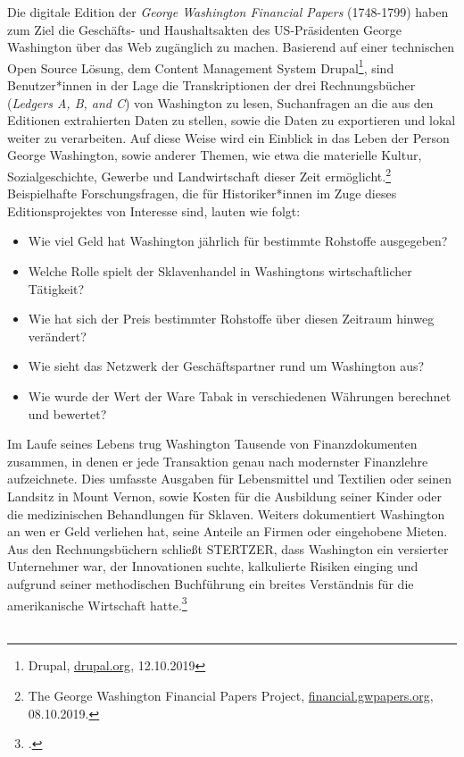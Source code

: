 \documentclass[12pt,a4paper]{article}
\begin{document}
Die digitale Edition der \textit{George Washington Financial Papers} (1748-1799) haben zum Ziel die Geschäfts- und Haushaltsakten des US-Präsidenten George Washington über das Web zugänglich zu machen. Basierend auf einer technischen Open Source Lösung, dem Content Management System Drupal\footnote{Drupal, \protect\url{drupal.org}, 12.10.2019}, sind Benutzer*innen in der Lage die Transkriptionen der drei Rechnungsbücher (\textit{Ledgers A, B, and C}) von Washington zu lesen, Suchanfragen an die aus den Editionen extrahierten Daten zu stellen, sowie die Daten zu exportieren und lokal weiter zu verarbeiten. Auf diese Weise wird ein Einblick in das Leben der Person George Washington, sowie  anderer Themen, wie etwa die materielle Kultur, Sozialgeschichte, Gewerbe und Landwirtschaft dieser Zeit ermöglicht.\footnote{The George Washington Financial Papers Project, \protect\url{financial.gwpapers.org}, 08.10.2019.} Beispielhafte Forschungsfragen, die für Historiker*innen im Zuge dieses Editionsprojektes von Interesse sind, lauten wie folgt: 
\begin{itemize}
\item Wie viel Geld hat Washington jährlich für bestimmte Rohstoffe ausgegeben?
\item Welche Rolle spielt der Sklavenhandel in Washingtons wirtschaftlicher Tätigkeit?
\item Wie hat sich der Preis bestimmter Rohstoffe über diesen Zeitraum hinweg verändert?
\item Wie sieht das Netzwerk der Geschäftspartner rund um Washington aus?
\item Wie wurde der Wert der Ware Tabak in verschiedenen Währungen berechnet und bewertet?
\end{itemize}
Im Laufe seines Lebens trug Washington Tausende von Finanzdokumenten zusammen, in denen er jede Transaktion genau nach modernster Finanzlehre aufzeichnete. Dies umfasste Ausgaben für Lebensmittel und Textilien oder seinen Landsitz in Mount Vernon, sowie Kosten für die Ausbildung seiner Kinder oder die medizinischen Behandlungen für Sklaven. Weiters dokumentiert Washington an wen er Geld verliehen hat, seine Anteile an Firmen oder eingehobene Mieten.
Aus den Rechnungsbüchern schließt STERTZER, dass Washington ein versierter Unternehmer war, der Innovationen suchte, kalkulierte Risiken einging und aufgrund seiner methodischen Buchführung ein breites Verständnis für die amerikanische Wirtschaft hatte.\footcite[][]{stertzer2014working}
\\
\\
\end{document}
